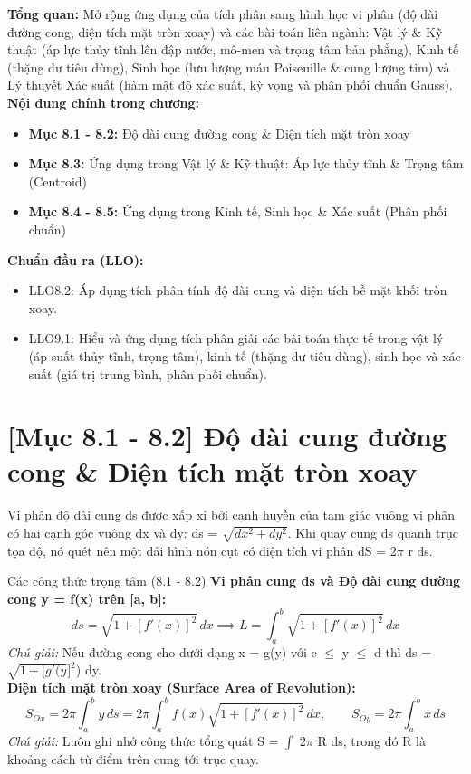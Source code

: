 \documentclass[11pt,a4paper,oneside]{book}
\begin{document}
\begin{tcolorbox}[colback=slate!5!white,colframe=slate!75!black,title={\textbf{Mục lục Chương 8 \& Chuẩn đầu ra (Buổi 8 - 9)}}]
\textbf{Tổng quan:} Mở rộng ứng dụng của tích phân sang hình học vi phân (độ dài đường cong, diện tích mặt tròn xoay) và các bài toán liên ngành: Vật lý \& Kỹ thuật (áp lực thủy tĩnh lên đập nước, mô-men và trọng tâm bản phẳng), Kinh tế (thặng dư tiêu dùng), Sinh học (lưu lượng máu Poiseuille \& cung lượng tim) và Lý thuyết Xác suất (hàm mật độ xác suất, kỳ vọng và phân phối chuẩn Gauss).\\[6pt]
\textbf{Nội dung chính trong chương:}
\begin{itemize}[leftmargin=1.5em, itemsep=2pt]
  \item \textbf{Mục 8.1 - 8.2:} Độ dài cung đường cong \& Diện tích mặt tròn xoay
  \item \textbf{Mục 8.3:} Ứng dụng trong Vật lý \& Kỹ thuật: Áp lực thủy tĩnh \& Trọng tâm (Centroid)
  \item \textbf{Mục 8.4 - 8.5:} Ứng dụng trong Kinh tế, Sinh học \& Xác suất (Phân phối chuẩn)
\end{itemize}
\textbf{Chuẩn đầu ra (LLO):}
\begin{itemize}[leftmargin=1.5em, itemsep=2pt]
  \item LLO8.2: Áp dụng tích phân tính độ dài cung và diện tích bề mặt khối tròn xoay.
  \item LLO9.1: Hiểu và ứng dụng tích phân giải các bài toán thực tế trong vật lý (áp suất thủy tĩnh, trọng tâm), kinh tế (thặng dư tiêu dùng), sinh học và xác suất (giá trị trung bình, phân phối chuẩn).
\end{itemize}
\end{tcolorbox}

\section{[Mục 8.1 - 8.2] Độ dài cung đường cong \& Diện tích mặt tròn xoay}
Vi phân độ dài cung ds được xấp xỉ bởi cạnh huyền của tam giác vuông vi phân có hai cạnh góc vuông dx và dy: ds = $\sqrt{dx^2 + dy^2}$. Khi quay cung ds quanh trục tọa độ, nó quét nên một dải hình nón cụt có diện tích vi phân dS = 2$\pi$  r ds.

\begin{congthuc}{Các công thức trọng tâm (8.1 - 8.2)}
\noindent\textbf{Vi phân cung ds và Độ dài cung đường cong y = f(x) trên [a, b]:}
\[ ds = \sqrt{1 + [f'(x)]^2}\,dx \implies L = \int_a^b \sqrt{1 + [f'(x)]^2}\,dx \]
\noindent\textit{Chú giải:} Nếu đường cong cho dưới dạng x = g(y) với c $\le$  y $\le$  d thì ds = $\sqrt{1 + [g'(y} ]^2$) dy.\\[4pt]
\noindent\textbf{Diện tích mặt tròn xoay (Surface Area of Revolution):}
\[ S_{Ox} = 2\pi \int_a^b y\,ds = 2\pi \int_a^b f(x)\sqrt{1 + [f'(x)]^2}\,dx, \qquad S_{Oy} = 2\pi \int_a^b x\,ds \]
\noindent\textit{Chú giải:} Luôn ghi nhớ công thức tổng quát S = $\int$ 2$\pi$ R ds, trong đó R là khoảng cách từ điểm trên cung tới trục quay.\\[4pt]
\end{congthuc}
\end{document}
